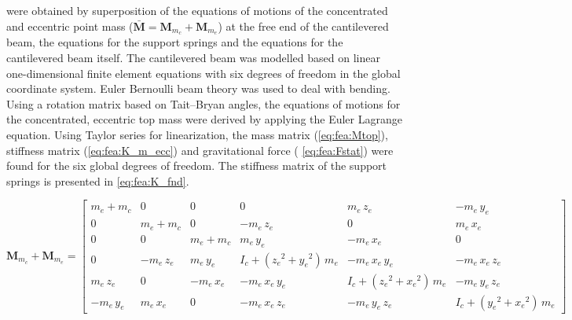 \documentclass{article}
\begin{document}
were obtained by superposition of the equations of motions of the concentrated and eccentric point mass ($ \mathbf{\bar{M}} = \mathbf{M}_{m_c} + \mathbf{M}_{m_e}$) at the free end of the cantilevered beam, the equations for the support springs and the equations for the cantilevered beam itself. The cantilevered beam was modelled based on linear one-dimensional finite element equations with six degrees of freedom in the global coordinate system. Euler Bernoulli beam theory was used to deal with bending. Using a rotation matrix based on Tait–Bryan angles, the equations of motions for the concentrated, eccentric top mass were derived by applying the Euler Lagrange equation. Using Taylor series for linearization, the  mass matrix (\autoref{eq:fea:Mtop}), stiffness matrix (\autoref{eq:fea:K_m_ecc}) and gravitational force ( \autoref{eq:fea:Fstat}) were found for the six global degrees of freedom. The stiffness matrix of the support springs is presented in \autoref{eq:fea:K_fnd}. 

\begin{small}
    \begin{equation}
        \mathbf{M}_{m_c} + \mathbf{M}_{m_e}  = 
        \begin{bmatrix}
         m_{e}+m_{c}   & 0             & 0             & 0                                             & m_{e}\,z_{e}                                  & -m_{e}\,y_{e}        \\ 
         0             & m_{e}+m_{c}   & 0             & -m_{e}\,z_{e}                                 & 0                                             & m_{e}\,x_{e}         \\ 
         0             & 0              & m_{e}+m_{c}   & m_{e}\,y_{e}                                  & -m_{e}\,x_{e}                                 & 0                    \\ 
         0             & -m_{e}\,z_{e} & m_{e}\,y_{e}  & I_{c}+\left({z_{e}}^2+{y_{e}}^2\right)\,m_{e} & -m_{e}\,x_{e}\,y_{e}                          & -m_{e}\,x_{e}\,z_{e} \\ 
         m_{e}\,z_{e}  & 0             & -m_{e}\,x_{e} & -m_{e}\,x_{e}\,y_{e}                          & I_{c}+\left({z_{e}}^2+{x_{e}}^2\right)\,m_{e} & -m_{e}\,y_{e}\,z_{e} \\
         -m_{e}\,y_{e} & m_{e}\,x_{e}  & 0             & -m_{e}\,x_{e}\,z_{e}                          & -m_{e}\,y_{e}\,z_{e}                          & I_{c}+\left({y_{e}}^2+{x_{e}}^2\right)\,m_{e} 
        \end{bmatrix}
        \label{eq:fea:Mtop}
    \end{equation}
\end{small}
\end{document}
